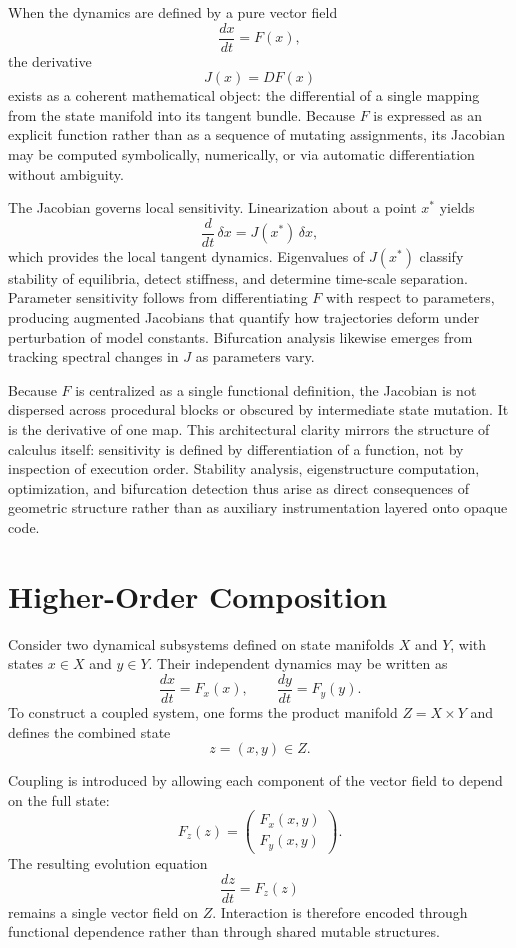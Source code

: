 \documentclass[12pt]{book}
\begin{document}
When the dynamics are defined by a pure vector field
\[
\frac{dx}{dt} = F(x),
\]
the derivative
\[
J(x) = DF(x)
\]
exists as a coherent mathematical object: the differential of a single
mapping from the state manifold into its tangent bundle. Because $F$
is expressed as an explicit function rather than as a sequence of
mutating assignments, its Jacobian may be computed symbolically,
numerically, or via automatic differentiation without ambiguity.

The Jacobian governs local sensitivity. Linearization about a point
$x^\ast$ yields
\[
\frac{d}{dt}\,\delta x = J(x^\ast)\,\delta x,
\]
which provides the local tangent dynamics. Eigenvalues of $J(x^\ast)$
classify stability of equilibria, detect stiffness, and determine
time-scale separation. Parameter sensitivity follows from differentiating
$F$ with respect to parameters, producing augmented Jacobians that
quantify how trajectories deform under perturbation of model constants.
Bifurcation analysis likewise emerges from tracking spectral changes
in $J$ as parameters vary.

Because $F$ is centralized as a single functional definition, the
Jacobian is not dispersed across procedural blocks or obscured by
intermediate state mutation. It is the derivative of one map. This
architectural clarity mirrors the structure of calculus itself:
sensitivity is defined by differentiation of a function, not by
inspection of execution order. Stability analysis, eigenstructure
computation, optimization, and bifurcation detection thus arise as
direct consequences of geometric structure rather than as auxiliary
instrumentation layered onto opaque code.

\section{Higher-Order Composition}

Consider two dynamical subsystems defined on state manifolds
$X$ and $Y$, with states $x \in X$ and $y \in Y$. Their
independent dynamics may be written as
\[
\frac{dx}{dt} = F_x(x), 
\qquad
\frac{dy}{dt} = F_y(y).
\]
To construct a coupled system, one forms the product manifold
$Z = X \times Y$ and defines the combined state
\[
z = (x,y) \in Z.
\]

Coupling is introduced by allowing each component of the vector field
to depend on the full state:
\[
F_z(z)
=
\begin{pmatrix}
F_x(x,y) \\
F_y(x,y)
\end{pmatrix}.
\]
The resulting evolution equation
\[
\frac{dz}{dt} = F_z(z)
\]
remains a single vector field on $Z$. Interaction is therefore encoded
through functional dependence rather than through shared mutable
structures.
\end{document}
